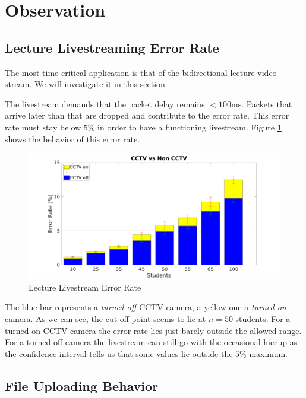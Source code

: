 \documentclass[a4paper]{scrreprt}
\begin{document}
	\section{Observation}\label{chp:observations}
		\subsection{Lecture Livestreaming Error Rate}\label{sec:errorrate}
			The most time critical application is that of the bidirectional lecture video stream. We will investigate it in this section. 
			
			The livestream demands that the packet delay remains $<100\text{ms}$. Packets that arrive later than that are dropped and contribute to the error rate. This error rate must stay below $5\%$ in order to have a functioning livestream. Figure \ref{fig:errorrate} shows the behavior of this error rate. 
			
			\begin{figure}[H]
				\center\includegraphics[width=\textwidth]{../Results_Analysis/Combining_1st_3rd_analysis/plot_all.png}
				\caption{Lecture Livestream Error Rate}
				\label{fig:errorrate}
			\end{figure}
			
			The blue bar represents a \emph{turned off} CCTV camera, a yellow one a \emph{turned on} camera. As we can see, the cut-off point seems to lie at $n=50$ students. For a turned-on CCTV camera the error rate lies just barely outside the allowed range. For a turned-off camera the livestream can still go with the occasional hiccup as the confidence interval tells us that some values lie outside the $5\%$ maximum.						
			
		\subsection{File Uploading Behavior}\label{sec:ftp}
		
\end{document}
